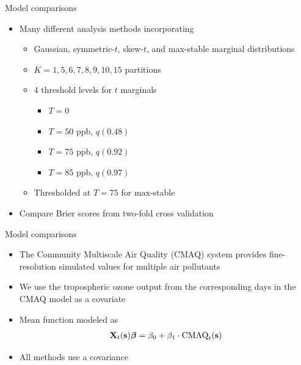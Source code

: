 \documentclass{beamer}
\begin{document}
\begin{frame}{Model comparisons}
  \begin{itemize} \setlength{\itemsep}{1em}
    \item Many different analysis methods incorporating \vspace{0.5em}
    \begin{itemize} \setlength{\itemsep}{0.5em}
      \item Gaussian, symmetric-$t$, skew-$t$, and max-stable marginal distributions
      \item $K=1, 5, 6, 7, 8, 9, 10, 15$ partitions
      \item 4 threshold levels for $t$ marginals \vspace{0.25em}
      \begin{itemize} \setlength{\itemsep}{0.25em}
         \item $T = 0$
         \item $T = 50$ ppb, $q(0.48)$
         \item $T = 75$ ppb, $q(0.92)$
         \item $T = 85$ ppb, $q(0.97)$
      \end{itemize}
      \item Thresholded at $T = 75$ for max-stable
    \end{itemize}
    \item Compare Brier scores from two-fold cross validation
  \end{itemize}
\end{frame}

\begin{frame}{Model comparisons}
  \begin{itemize} \setlength{\itemsep}{1em}
    \item The Community Multiscale Air Quality (CMAQ) system provides fine-resolution simulated values for multiple air pollutants
    \item We use the tropospheric ozone output from the corresponding days in the CMAQ model as a covariate
    \item Mean function modeled as
    \begin{align*}
    	\mbox{\bf X}_t(\mbox{\bf s}) \mbox{\boldmath $\beta$} = \beta_0 + \beta_1 \cdot \text{CMAQ}_t (\mbox{\bf s})
    \end{align*}
    \item All methods use a \Matern covariance
   \end{itemize}
\end{frame}
\end{document}
